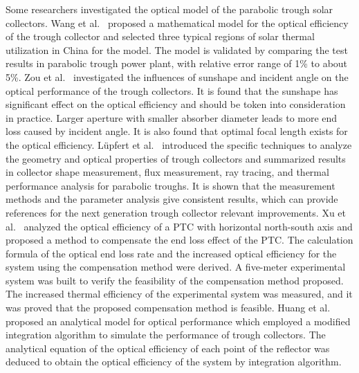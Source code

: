 Some researchers investigated the optical model of the parabolic trough solar collectors.
Wang et al.~\cite{Wang2016} proposed a mathematical model for the optical efficiency of the trough collector and selected three typical regions of solar thermal utilization in China for the model. The model is validated by comparing the test results in parabolic trough power plant, with relative error range of 1\% to about 5\%.
Zou et al.~\cite{Zou2017} investigated the influences of sunshape and incident angle on the optical performance of the trough collectors. It is found that the sunshape has significant effect on the optical efficiency and should be token into consideration in practice. Larger aperture with smaller absorber diameter leads to more end loss caused by incident angle. It is also found that optimal focal length exists for the optical efficiency.
L\"upfert et al.~\cite{Lupfert2006} introduced the specific techniques to analyze the geometry and optical properties of trough collectors and summarized results in collector shape measurement, flux measurement, ray tracing, and thermal performance analysis for parabolic troughs. It is shown that the measurement methods and the parameter analysis give consistent results, which can provide references for the next generation trough collector relevant improvements.
Xu et al.~\cite{Xu2014} analyzed the optical efficiency of a PTC with horizontal north-south axis and proposed a method to compensate the end loss effect of the PTC. The calculation formula of the optical end loss rate and the increased optical efficiency for the system using the compensation method were derived. A five-meter experimental system was built to verify the feasibility of the compensation method proposed. The increased thermal efficiency of the experimental system was measured, and it was proved that the proposed compensation method is feasible.
Huang et al.~\cite{Huang2012} proposed an analytical model for optical performance which employed a modified integration algorithm to simulate the performance of trough collectors. The analytical equation of the optical efficiency of each point of the reflector was deduced to obtain the optical efficiency of the system by integration algorithm.

